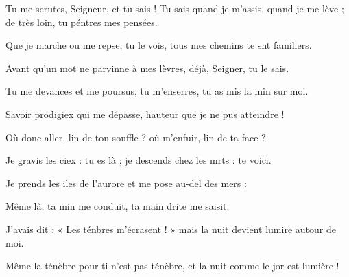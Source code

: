 \item Tu me scrutes, Seigneur, et tu sais ! Tu sais quand je m’assis, quand je me lève ; de très loin, tu péntres mes pensées.
\item Que je marche ou me repse, tu le vois, tous mes chemins te snt familiers.
\item Avant qu’un mot ne parvinne à mes lèvres, déjà, Seigner, tu le sais.
\item Tu me devances et me poursus, tu m’enserres, tu as mis la min sur moi.
\item Savoir prodigiex qui me dépasse, hauteur que je ne pus atteindre !
\item Où donc aller, lin de ton souffle ? où m’enfuir, lin de ta face ?
\item Je gravis les ciex : tu es là ; je descends chez les mrts : te voici.
\item Je prends les iles de l’aurore et me pose au-del des mers :
\item Même là, ta min me conduit, ta main drite me saisit.
\item J’avais dit : « Les ténbres m’écrasent ! » mais la nuit devient lumire autour de moi.
\item Même la ténèbre pour ti n’est pas ténèbre, et la nuit comme le jor est lumière !